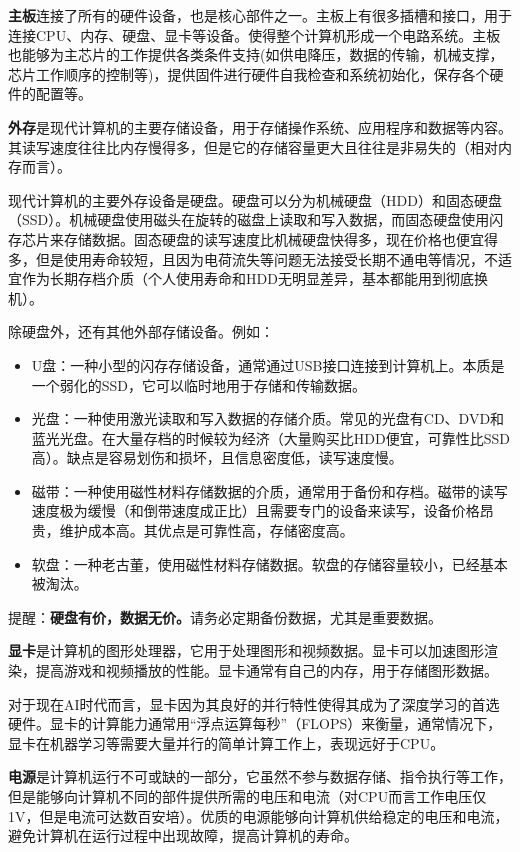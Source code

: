\documentclass[12pt]{report}
\begin{document}
\textbf{主板}连接了所有的硬件设备，也是核心部件之一。主板上有很多插槽和接口，用于连接CPU、内存、硬盘、显卡等设备。使得整个计算机形成一个电路系统。主板也能够为主芯片的工作提供各类条件支持(如供电降压，数据的传输，机械支撑，芯片工作顺序的控制等)，提供固件进行硬件自我检查和系统初始化，保存各个硬件的配置等。

\textbf{外存}是现代计算机的主要存储设备，用于存储操作系统、应用程序和数据等内容。其读写速度往往比内存慢得多，但是它的存储容量更大且往往是非易失的（相对内存而言）。

现代计算机的主要外存设备是硬盘。硬盘可以分为机械硬盘（HDD）和固态硬盘（SSD）。机械硬盘使用磁头在旋转的磁盘上读取和写入数据，而固态硬盘使用闪存芯片来存储数据。固态硬盘的读写速度比机械硬盘快得多，现在价格也便宜得多，但是使用寿命较短，且因为电荷流失等问题无法接受长期不通电等情况，不适宜作为长期存档介质（个人使用寿命和HDD无明显差异，基本都能用到彻底换机）。

除硬盘外，还有其他外部存储设备。例如：
\begin{itemize}
    \item U盘：一种小型的闪存存储设备，通常通过USB接口连接到计算机上。本质是一个弱化的SSD，它可以临时地用于存储和传输数据。
    \item 光盘：一种使用激光读取和写入数据的存储介质。常见的光盘有CD、DVD和蓝光光盘。在大量存档的时候较为经济（大量购买比HDD便宜，可靠性比SSD高）。缺点是容易划伤和损坏，且信息密度低，读写速度慢。
    \item 磁带：一种使用磁性材料存储数据的介质，通常用于备份和存档。磁带的读写速度极为缓慢（和倒带速度成正比）且需要专门的设备来读写，设备价格昂贵，维护成本高。其优点是可靠性高，存储密度高。
    \item 软盘：一种老古董，使用磁性材料存储数据。软盘的存储容量较小，已经基本被淘汰。
\end{itemize}

提醒：\textbf{硬盘有价，数据无价。}请务必定期备份数据，尤其是重要数据。

\textbf{显卡}是计算机的图形处理器，它用于处理图形和视频数据。显卡可以加速图形渲染，提高游戏和视频播放的性能。显卡通常有自己的内存，用于存储图形数据。

对于现在AI时代而言，显卡因为其良好的并行特性使得其成为了深度学习的首选硬件。显卡的计算能力通常用“浮点运算每秒”（FLOPS）来衡量，通常情况下，显卡在机器学习等需要大量并行的简单计算工作上，表现远好于CPU。

\textbf{电源}是计算机运行不可或缺的一部分，它虽然不参与数据存储、指令执行等工作，但是能够向计算机不同的部件提供所需的电压和电流（对CPU而言工作电压仅1V，但是电流可达数百安培）。优质的电源能够向计算机供给稳定的电压和电流，避免计算机在运行过程中出现故障，提高计算机的寿命。
\end{document}
